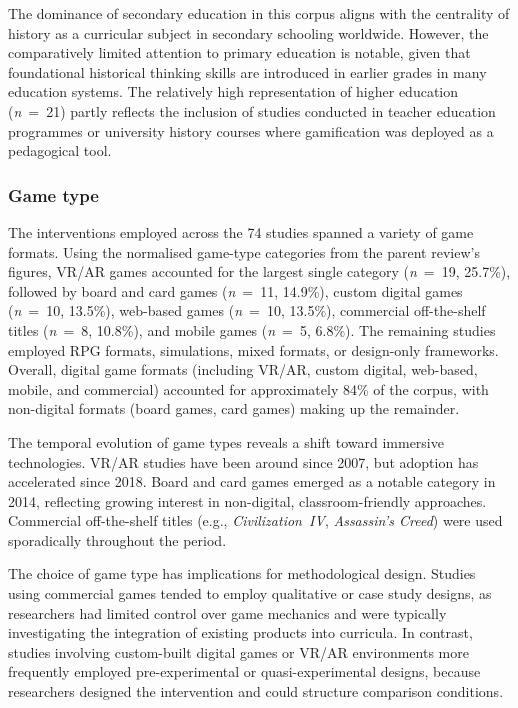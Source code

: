 \documentclass[etq]{acnsart}
\begin{document}
	The dominance of secondary education in this corpus aligns with the centrality of history as a curricular subject in secondary schooling worldwide. However, the comparatively limited attention to primary education is notable, given that foundational historical thinking skills are introduced in earlier grades in many education systems. The relatively high representation of higher education (\textit{n}~=~21) partly reflects the inclusion of studies conducted in teacher education programmes or university history courses where gamification was deployed as a pedagogical tool.
	
	\subsubsection{Game type}
	\label{sec:results_rq1_gametype}
	
	The interventions employed across the 74 studies spanned a variety of game formats. Using the normalised game-type categories from the parent review's figures, VR/AR games accounted for the largest single category (\textit{n}~=~19, 25.7\%), followed by board and card games (\textit{n}~=~11, 14.9\%), custom digital games (\textit{n}~=~10, 13.5\%), web-based games (\textit{n}~=~10, 13.5\%), commercial off-the-shelf titles (\textit{n}~=~8, 10.8\%), and mobile games (\textit{n}~=~5, 6.8\%). The remaining studies employed RPG formats, simulations, mixed formats, or design-only frameworks. Overall, digital game formats (including VR/AR, custom digital, web-based, mobile, and commercial) accounted for approximately 84\% of the corpus, with non-digital formats (board games, card games) making up the remainder.
	
	The temporal evolution of game types reveals a shift toward immersive technologies. VR/AR studies have been around since 2007, but adoption has accelerated since 2018. Board and card games emerged as a notable category in 2014, reflecting growing interest in non-digital, classroom-friendly approaches. Commercial off-the-shelf titles (e.g., \textit{Civilization~IV}, \textit{Assassin's Creed}) were used sporadically throughout the period.
	
	The choice of game type has implications for methodological design. Studies using commercial games tended to employ qualitative or case study designs, as researchers had limited control over game mechanics and were typically investigating the integration of existing products into curricula. In contrast, studies involving custom-built digital games or VR/AR environments more frequently employed pre-experimental or quasi-experimental designs, because researchers designed the intervention and could structure comparison conditions.
	
\end{document}
